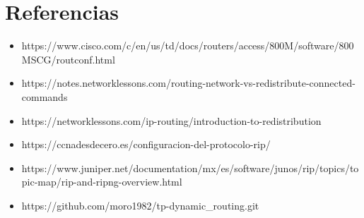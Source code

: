 \documentclass{article}
\begin{document}
\section{Referencias}
\begin{itemize}
    \item https://www.cisco.com/c/en/us/td/docs/routers/access/800M/software/800MSCG/routconf.html

    \item https://notes.networklessons.com/routing-network-vs-redistribute-connected-commands

    \item https://networklessons.com/ip-routing/introduction-to-redistribution

    \item https://ccnadesdecero.es/configuracion-del-protocolo-rip/

    \item https://www.juniper.net/documentation/mx/es/software/junos/rip/topics/topic-map/rip-and-ripng-overview.html

    \item https://github.com/moro1982/tp-dynamic\_routing.git
    
\end{itemize}

\texttt{}
\end{document}
